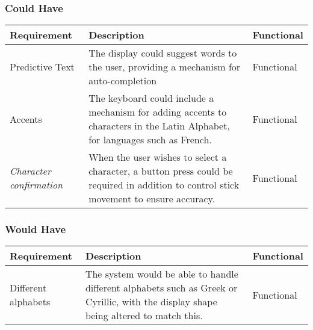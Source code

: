 \documentclass[requirements.tex]{subfiles}
\begin{document}
\subsubsection{Could Have} %
\label{ssub:after_could_have}
\begin{table}[H]
\small
\begin{tabularx}{\textwidth}{| l | X | l |}
 \hline
 \textbf{Requirement} & \textbf{Description} & \textbf{Functional} \\
 \hline
 Predictive Text & The display could suggest words to the user, providing a
 mechanism for auto-completion & Functional \\
 \hline
 Accents & The keyboard could include a mechanism for adding accents to
 characters in the Latin Alphabet, for languages such as French. & Functional \\
 \hline
 \emph{Character confirmation} & When the user wishes to select a character, a
 button press could be required in addition to control stick movement to ensure
 accuracy. & Functional \\
 \hline
\end{tabularx}
\end{table}

\subsubsection{Would Have} %
\label{ssub:after_would_have}
\begin{table}[H]
\small
\begin{tabularx}{\textwidth}{| l | X | l |}
 \hline
 \textbf{Requirement} & \textbf{Description} & \textbf{Functional} \\
 \hline
 Different alphabets & The system would be able to handle different alphabets
 such as Greek or Cyrillic, with the display shape being altered to match this.
 & Functional \\
 \hline
\end{tabularx}
\end{table}
\end{document}
